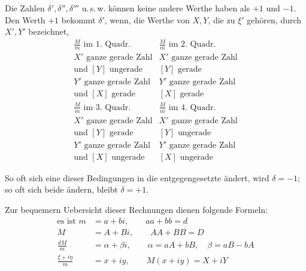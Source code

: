 Die Zahlen $\delta',\delta'',\delta'''$ u.\,s.\,w. können keine andere Werthe haben als $+1$ und $-1$. Den Werth $+1$ bekommt $\delta'$, wenn, die Werthe von $X,Y$, die zu $\xi'$ gehören, durch $X',Y'$ bezeichnet,
\[
\begin{array}{l|l}
\frac{M}{m}\text{ im 1. Quadr.}&\frac{M}{m}\text{ im 2. Quadr.}\\
X'\text{ ganze gerade Zahl}&X'\text{ ganze gerade Zahl}\\
\text{und }[Y]\text{ ungerade}&[Y]\text{ gerade}\\\hline
Y'\text{ ganze gerade Zahl}&Y'\text{ ganze gerade Zahl}\\
\text{und }[X]\text{ gerade}&[X]\text{ gerade}
\end{array}
\]
\[
\begin{array}{l|l}
\frac{M}{m}\text{ im 3. Quadr.}&\frac{M}{m}\text{ im 4. Quadr.}\\
X'\text{ ganze gerade Zahl}&X'\text{ ganze gerade Zahl}\\
\text{und }[Y]\text{ gerade}&[Y]\text{ ungerade}\\\hline
Y'\text{ ganze gerade Zahl}&Y'\text{ ganze gerade Zahl}\\
\text{und }[X]\text{ ungerade}&[X]\text{ ungerade}
\end{array}
\]

So oft sich eine dieser Bedingungen in die entgegengesetzte ändert, wird $\delta=-1$; so oft sich beide ändern, bleibt $\delta=+1$.

Zur bequemern Uebersicht dieser Rechnungen dienen folgende Formeln:
\[
\begin{aligned}
\text{es ist }m&=a+bi,\qquad aa+bb=d\\
M&=A+Bi,\qquad AA+BB=D\\
\frac{dM}{m}&=\alpha+\beta i,\qquad\alpha=aA+bB,\quad\beta=aB-bA\\
\frac{\xi+i\eta}{m}&=x+iy,\qquad M(x+iy)=X+iY
\end{aligned}
\]

